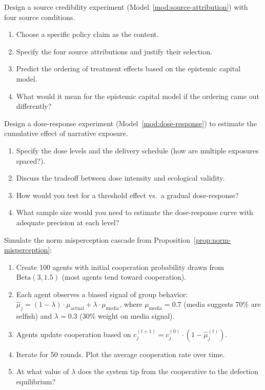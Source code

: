 \begin{exercise}
Design a source credibility experiment (Model~\ref{mod:source-attribution}) with four source conditions.
\begin{enumerate}[nosep]
  \item Choose a specific policy claim as the content.
  \item Specify the four source attributions and justify their selection.
  \item Predict the ordering of treatment effects based on the epistemic capital model.
  \item What would it mean for the epistemic capital model if the ordering came out differently?
\end{enumerate}
\end{exercise}

\begin{exercise}
Design a dose-response experiment (Model~\ref{mod:dose-response}) to estimate the cumulative effect of narrative exposure.
\begin{enumerate}[nosep]
  \item Specify the dose levels and the delivery schedule (how are multiple exposures spaced?).
  \item Discuss the tradeoff between dose intensity and ecological validity.
  \item How would you test for a threshold effect vs.\ a gradual dose-response?
  \item What sample size would you need to estimate the dose-response curve with adequate precision at each level?
\end{enumerate}
\end{exercise}

\begin{exercise}[Computational]
Simulate the norm misperception cascade from Proposition~\ref{prop:norm-misperception}:
\begin{enumerate}[nosep]
  \item Create 100 agents with initial cooperation probability drawn from $\text{Beta}(3, 1.5)$ (most agents tend toward cooperation).
  \item Each agent observes a biased signal of group behavior: $\hat{\mu}_j = (1-\lambda) \cdot \mu_{\text{actual}} + \lambda \cdot \mu_{\text{media}}$, where $\mu_{\text{media}} = 0.7$ (media suggests 70\% are selfish) and $\lambda = 0.3$ (30\% weight on media signal).
  \item Agents update cooperation based on $c_j^{(t+1)} = c_j^{(0)} \cdot (1 - \hat{\mu}_j^{(t)})$.
  \item Iterate for 50 rounds. Plot the average cooperation rate over time.
  \item At what value of $\lambda$ does the system tip from the cooperative to the defection equilibrium?
\end{enumerate}
\end{exercise}
